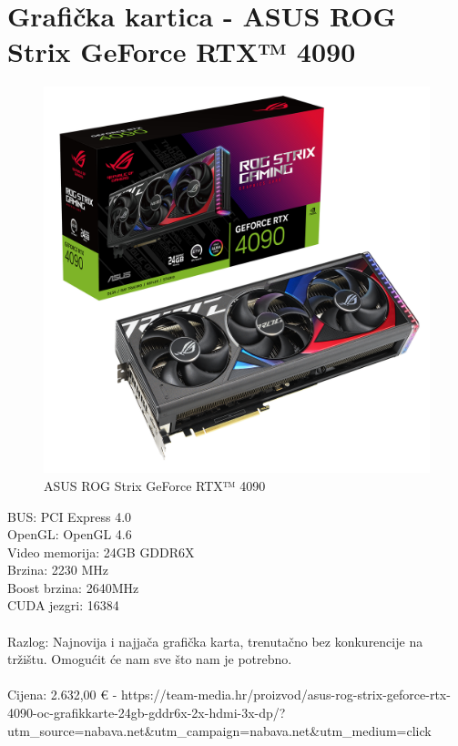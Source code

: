 \documentclass{report}
\begin{document}
\pagebreak

\section{Grafička kartica - ASUS ROG Strix GeForce RTX™ 4090}
\begin{figure}[H]
    \centering
    \includegraphics[scale=0.13]{Slike/rtx4090.png}
    \caption{ASUS ROG Strix GeForce RTX™ 4090}
    \label{fig:graficka}
\end{figure}
BUS: PCI Express 4.0\\OpenGL: OpenGL 4.6\\Video memorija: 24GB GDDR6X\\Brzina: 2230 MHz\\Boost brzina: 2640MHz\\CUDA jezgri: 16384\\\\Razlog: Najnovija i najjača grafička karta, trenutačno bez konkurencije na tržištu. Omogućit će nam sve što nam je potrebno.\\\\Cijena: 2.632,00 € - https://team-media.hr/proizvod/asus-rog-strix-geforce-rtx-4090-oc-grafikkarte-24gb-gddr6x-2x-hdmi-3x-dp/?utm\_source=nabava.net\&utm\_campaign=nabava.net\&utm\_medium=click

\pagebreak
\end{document}
